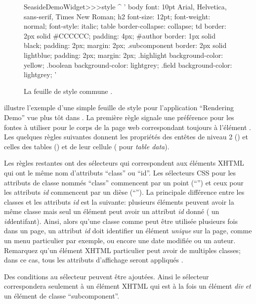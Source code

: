 \documentclass[a4paper,10pt,twoside]{book}
\begin{document}
\begin{figure}[tb]
\begin{code}{}
SeasideDemoWidget>>>style
	^ '
body {
	font: 10pt Arial, Helvetica, sans-serif, Times New Roman;
}
h2 {
	font-size: 12pt;
	font-weight: normal;
	font-style: italic;
}
table { border-collapse: collapse; }
td {
	border: 2px solid #CCCCCC;
	padding: 4px;
}
#author {
	border: 1px solid black;
	padding: 2px;
	margin: 2px;
}
.subcomponent {
	border: 2px solid lightblue;
	padding: 2px;
	margin: 2px;
}
.highlight { background-color: yellow; }
.boolean { background-color: lightgrey; }
.field { background-color: lightgrey; }
'
\end{code}
\caption{La feuille de style commune .
}
\end{figure}
 illustre l'exemple d'une simple feuille de style pour
l'application ``Rendering Demo'' vue plus tôt dans
.
La première règle signale une préférence pour les fontes à utiliser
pour le corps de la page web correspondant toujours à l'élément .
Les quelques règles suivantes donnent les propriétés des entêtes de
niveau 2 () et celles des tables () et de leur
cellule ( pour \emph{table data}).

Les règles restantes ont des sélecteurs qui correspondent aux éléments
XHTML qui ont le même nom d'attributs ``class'' ou ``id''.
Les sélecteurs CSS pour les attributs de classe nommés ``class''
commencent par un point (``'') et ceux pour les attributs \emph{id}
commencent par un dièse (``\ct{#}'').
La principale différence entre les classes et les attributs \emph{id}
est la suivante: plusieurs éléments peuvent avoir la même classe mais
seul un élément peut avoir un attribut \emph{id} donné (\ie{} un
\emph{id}{dentifant}).
Ainsi, alors qu'une classe comme  peut être utilisée
plusieurs fois dans un page, un attribut \emph{id} doit identifier un
élément \emph{unique} sur la page, comme un menu particulier par
exemple, ou encore une date modifiée ou un auteur.
Remarquez qu'un élément XHTML particulier peut avoir de multiples
classes; dans ce cas, tous les attributs d'affichage seront appliqués
.


Des conditions au sélecteur peuvent être ajoutées. Ainsi le sélecteur
 correspondera seulement à un élément XHTML qui
est à la fois un élément \emph{div} \emph{et} un élément de classe
``subcomponent''.
\end{document}
